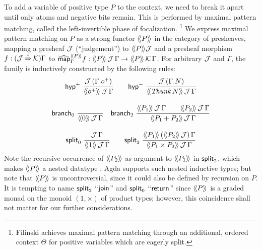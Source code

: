 \documentclass[sigplan,screen,fleqn,review]{acmart} %
\begin{document}
To add a variable of positive type $P$ to the context, we need to
break it apart until only atoms and negative bits remain.  This is
performed by maximal pattern matching, called the left-invertible
phase of focalization.%
\footnote{Filinski \cite[Section~4]{filinski:tlca01} achieves maximal pattern
matching through an additional, ordered context $\Theta$ for positive
variables which are eagerly split.}
We express maximal pattern matching on $P$ as a strong functor
$\Add P$ in the category of presheaves,
mapping a presheaf $\J$ (``judgement'') to $\Add P \J$
and a presheaf morphism $f : (\J \hatto \K)\Gamma$ to
$\stmap[\Add P]_\Gamma f : \AddHyp P \J \Gamma \to \AddHyp P \K \Gamma$.
For arbitrary $\J$ and $\Gamma$, the family  is
inductively constructed by the following rules:
\begin{gather*}
  \nru{\phyp}
      {\J\,(\cext \Gamma \patom)}
      {\AddHyp {\patom} \J \Gamma}
\qquad
  \nru{\nhyp}
      {\J\,(\cext \Gamma N)}
      {\AddHyp {\Thunk N} \J \Gamma}
\\[2ex]
  \nru{\nbranch}
      {}
      {\AddHyp {\tyzero} \J \Gamma}
\quad
  \nru{\bbranch}
      {\AddHyp {P_1} \J \Gamma \qquad
       \AddHyp {P_2} \J \Gamma }
      {\AddHyp {P_1 + P_2} \J \Gamma}
\\[2ex]
  \nru{\nsplit}
      {\J\,\Gamma}
      {\AddHyp {\tyone} \J \Gamma}
\qquad
  \nru{\bsplit}
      {\AddHyp {P_1} {\left(\Add{P_2}\,\J\right)} \Gamma}
      {\AddHyp {P_1 \times P_2} \J \Gamma}
\end{gather*}
Note the recursive occurrence of $\Add{P_2}$ as argument to
$\Add{P_1}$ in $\bsplit$, which makes $\Add P$ a nested datatype
\cite{bird:nested}.  Agda supports such nested inductive types; but
note that $\Add{P}$ is uncontroversial, since it could also be defined
by recursion on $P$.   It is tempting to name $\bsplit$
``$\tjoin$'' and $\nsplit$ ``$\treturn$''
since $\Add P$ is a graded monad on the monoid $(1,\times)$
of product types;
however, this coincidence shall not matter for our further considerations.
\end{document}
